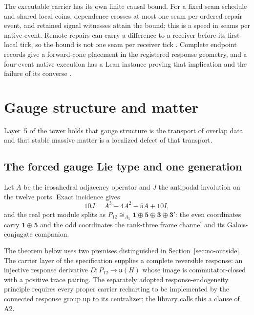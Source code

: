 \documentclass[11pt]{article}
\theoremstyle{definition}
\theoremstyle{remark}
\begin{document}
The executable carrier has its own finite causal bound. For a fixed seam
schedule and shared local coins, dependence crosses at most one seam per
ordered repair event, and retained signal witnesses attain the bound; this is
a speed in seams per native event. Remote repairs can carry a difference to a
receiver before its first local tick, so the bound is not one seam per
receiver tick \cite{ophcausality,ophmodel}. Complete endpoint records give a
forward-cone placement in the registered response geometry, and a four-event
native execution has a Lean instance proving that implication and the
failure of its converse \cite{ophrepo}.

\section{Gauge structure and matter}
\label{sec:gauge}

Layer~5 of the tower holds that gauge structure is the transport of overlap
data and that stable massive matter is a localized defect of that transport.

\subsection{The forced gauge Lie type and one generation}

Let $A$ be the icosahedral adjacency operator and $J$ the antipodal
involution on the twelve ports. Exact incidence gives
\begin{equation}
10J=A^3-4A^2-5A+10I ,
\label{eq:antipode-polynomial}
\end{equation}
and the real port module splits as
$P_{12}\cong_{A_5}\mathbf1\oplus\mathbf5\oplus\mathbf3\oplus\mathbf3'$: the
even coordinates carry $\mathbf1\oplus\mathbf5$ and the odd coordinates the
rank-three frame channel and its Galois-conjugate companion.

The theorem below uses two premises distinguished in Section~\ref{sec:no-outside}. The carrier layer of the specification supplies
a complete reversible response: an injective response derivative
$D:P_{12}\to\mathfrak u(H)$ whose image is commutator-closed with a positive
trace pairing. The separately adopted response-endogeneity principle
requires every proper carrier recharting to be implemented by the connected
response group up to its centralizer; the library calls this a clause of A2.
\end{document}
